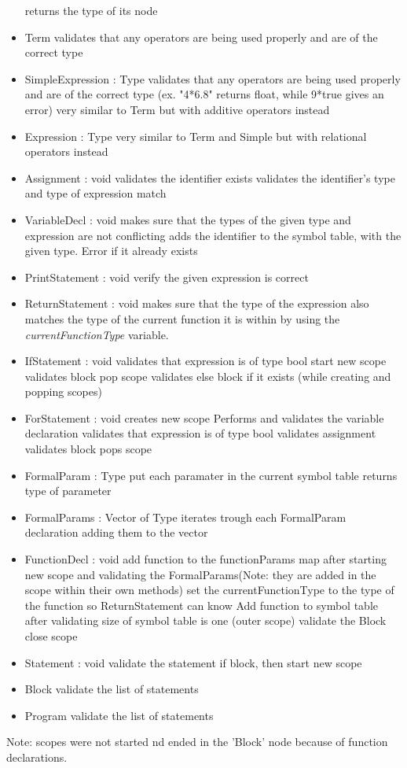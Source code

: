 \begin{itemize}
		\subitem returns the type of its node
	\item Term
		\subitem validates that any operators are being used properly and are of the correct type
	\item SimpleExpression : Type
		\subitem validates that any operators are being used properly and are of the correct type (ex. "4*6.8" returns float, while 9*true gives an error)
		\subitem very similar to Term but with additive operators instead
	\item Expression : Type
		\subitem very similar to Term and Simple but with relational operators instead
	\item Assignment : void
		\subitem validates the identifier exists
		\subitem validates the identifier's type and type of expression match
	\item VariableDecl : void
		\subitem makes sure that the types of the given type and expression are not conflicting
		\subitem adds the identifier to the symbol table, with the given type. Error if it already exists
	\item PrintStatement : void
		\subitem verify the given expression is correct
	\item ReturnStatement : void
		\subitem makes sure that the type of the expression also matches the type of the current function it is within by using the \textit{currentFunctionType} variable.
	\item IfStatement : void
		\subitem validates that expression is of type bool
		\subitem start new scope
		\subitem validates block
		\subitem pop scope
		\subitem validates else block if it exists (while creating and popping scopes)
	\item ForStatement : void
		\subitem creates new scope
		\subitem Performs and validates the variable declaration
		\subitem validates that expression is of type bool
		\subitem validates assignment
		\subitem validates block
		\subitem pops scope
	\item FormalParam : Type
		\subitem put each paramater in the current symbol table
		\subitem returns type of parameter
	\item FormalParams : Vector of Type
		\subitem iterates trough each FormalParam declaration adding them to the vector
	\item FunctionDecl : void
		\subitem add function to the functionParams map after starting new scope and  validating the FormalParams(Note: they are added in the scope within their own methods)
		\subitem set the currentFunctionType to the type of the function so ReturnStatement can know
		Add function to symbol table after validating size of symbol table is one (outer scope)
		\subitem validate the Block
		\subitem close scope
	\item Statement : void
		\subitem validate the statement
		\subitem if block, then start new scope
	\item Block
		\subitem validate the list of statements
	\item Program
		\subitem validate the list of statements
\end{itemize}

Note: scopes were not started nd ended in the 'Block' node because of function declarations.